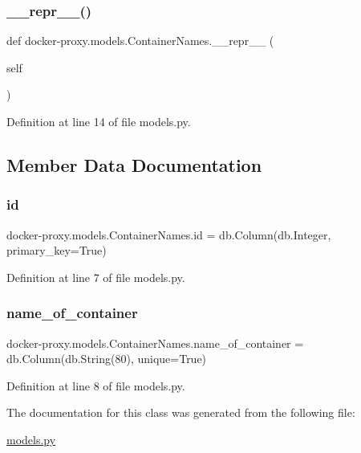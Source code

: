 \subsubsection{\texorpdfstring{\+\_\+\+\_\+repr\+\_\+\+\_\+()}{\_\_repr\_\_()}}
{\footnotesize\ttfamily def docker-\/proxy.\+models.\+Container\+Names.\+\_\+\+\_\+repr\+\_\+\+\_\+ (\begin{DoxyParamCaption}\item[{}]{self }\end{DoxyParamCaption})}



Definition at line 14 of file models.\+py.



\subsection{Member Data Documentation}
\hypertarget{classdocker-proxy_1_1models_1_1_container_names_a6600e5199beb00fa24ff7b6b104cf4c1}{}\label{classdocker-proxy_1_1models_1_1_container_names_a6600e5199beb00fa24ff7b6b104cf4c1} 
\subsubsection{\texorpdfstring{id}{id}}
{\footnotesize\ttfamily docker-\/proxy.\+models.\+Container\+Names.\+id = db.\+Column(db.\+Integer, primary\+\_\+key=True)\hspace{0.3cm}{\ttfamily [static]}}



Definition at line 7 of file models.\+py.

\hypertarget{classdocker-proxy_1_1models_1_1_container_names_ae84f0bb3f85f0483fdbe500c78ca814f}{}\label{classdocker-proxy_1_1models_1_1_container_names_ae84f0bb3f85f0483fdbe500c78ca814f} 
\subsubsection{\texorpdfstring{name\+\_\+of\+\_\+container}{name\_of\_container}}
{\footnotesize\ttfamily docker-\/proxy.\+models.\+Container\+Names.\+name\+\_\+of\+\_\+container = db.\+Column(db.\+String(80), unique=True)\hspace{0.3cm}{\ttfamily [static]}}



Definition at line 8 of file models.\+py.



The documentation for this class was generated from the following file\+:\begin{DoxyCompactItemize}
\item 
\hyperlink{models_8py}{models.\+py}\end{DoxyCompactItemize}
